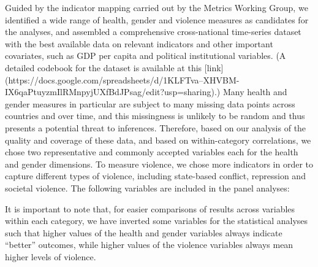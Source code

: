 \documentclass[12pt]{article}
\begin{document}
Guided by the indicator mapping carried out by the Metrics Working Group, we identified a wide range of health, gender and violence measures as candidates for the analyses, and assembled a comprehensive cross-national time-series dataset with the best available data on relevant indicators and other important covariates, such as GDP per capita and political institutional variables. (A detailed codebook for the dataset is available at this [link](https://docs.google.com/spreadsheets/d/1KLFTva--XHVBM-IX6qaPtuyzmIlRMnpyjUXfBdJPsag/edit?usp=sharing).) Many health and gender measures in particular are subject to many missing data points across countries and over time, and this missingness is unlikely to be random and thus presents a potential threat to inferences. Therefore, based on our analysis of the quality and coverage of these data, and based on within-category correlations, we chose two representative and commonly accepted variables each for the health and gender dimensions. To measure violence, we chose more indicators in order to capture different types of violence, including state-based conflict, repression and societal violence. The following variables are included in the panel analyses:

It is important to note that, for easier comparisons of results across variables within each category, we have inverted some variables for the statistical analyses such that higher values of the health and gender variables always indicate \enquote{better} outcomes, while higher values of the violence variables always mean higher levels of violence.
\end{document}
